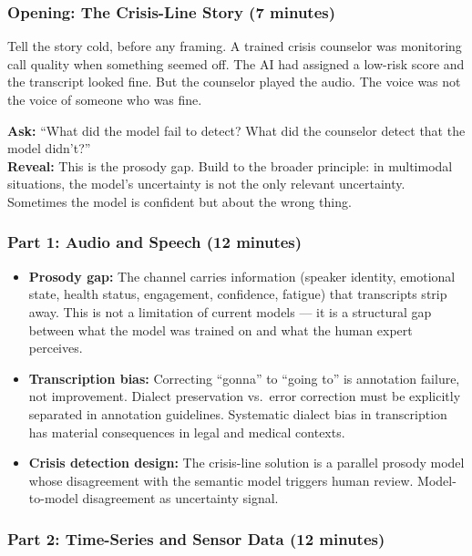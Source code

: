 \subsubsection{Opening: The Crisis-Line Story (7 minutes)}

Tell the story cold, before any framing. A trained crisis counselor was monitoring call quality when something seemed off. The AI had assigned a low-risk score and the transcript looked fine. But the counselor played the audio. The voice was not the voice of someone who was fine.

\begin{trythis}
\textbf{Ask:} ``What did the model fail to detect? What did the counselor detect that the model didn't?''\\[0.5em]
\textbf{Reveal:} This is the prosody gap. Build to the broader principle: in multimodal situations, the model's uncertainty is not the only relevant uncertainty. Sometimes the model is confident but about the wrong thing.
\end{trythis}

\subsubsection{Part 1: Audio and Speech (12 minutes)}

\begin{itemize}
    \item \textbf{Prosody gap:} The channel carries information (speaker identity, emotional state, health status, engagement, confidence, fatigue) that transcripts strip away. This is not a limitation of current models --- it is a structural gap between what the model was trained on and what the human expert perceives.

    \item \textbf{Transcription bias:} Correcting ``gonna'' to ``going to'' is annotation failure, not improvement. Dialect preservation vs.\ error correction must be explicitly separated in annotation guidelines. Systematic dialect bias in transcription has material consequences in legal and medical contexts.

    \item \textbf{Crisis detection design:} The crisis-line solution is a parallel prosody model whose disagreement with the semantic model triggers human review. Model-to-model disagreement as uncertainty signal.
\end{itemize}

\subsubsection{Part 2: Time-Series and Sensor Data (12 minutes)}


